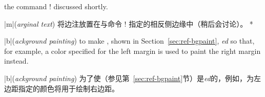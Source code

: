 \begin{description}
\begin{description}
\begin{paracol}{2}
the command \!\marginparthreshold! discussed shortly.
\switchcolumn
\item[|m|\rm(\textit{arginal text})]
将边注放置在与命令 \!\marginparthreshold! 指定的相反侧边缘中（稍后会讨论）。
\switchcolumn[0]*
\item[|b|\rm(\textit{ackground painting})]
to make \bgpaint, shown in Section~\ref{sec:ref-bgpaint},
\emph{\mirror{}ed} so that, for example, a color specified for the left
margin is used to paint the right margin instead.
\switchcolumn\item[|b|\rm(\textit{ackground painting})]
为了使\bgpaint（参见第~\ref{sec:ref-bgpaint}节）是\emph{\mirror{}ed}的，例如，为左边距指定的颜色将用于绘制右边距。
\end{paracol}
\end{description}


\end{description}
